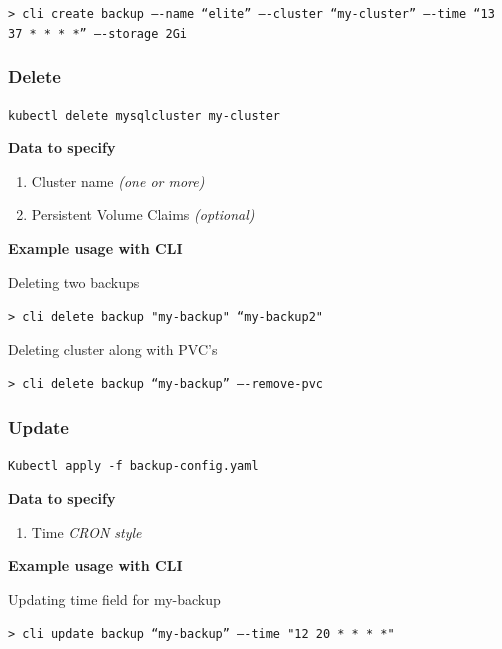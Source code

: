 \texttt{> cli create backup ----name “elite” ----cluster “my-cluster” \newline
 ----time “13 37  *  *  * *” ----storage 2Gi}

\subsubsection*{Delete}
\texttt{kubectl delete mysqlcluster my-cluster}

\noindent \textbf{Data to specify}
\begin{enumerate}
	\item Cluster name \textit{(one or more)}
	\item Persistent Volume Claims \textit{(optional)}
\end{enumerate}

\noindent \textbf{Example usage with CLI}

\noindent Deleting two backups

\texttt{> cli delete backup "my-backup" “my-backup2"}

\noindent Deleting cluster along with PVC’s

\texttt{> cli delete backup “my-backup” ----remove-pvc}

\subsubsection*{Update}
\texttt{Kubectl apply -f backup-config.yaml}

\noindent \textbf{Data to specify}
\begin{enumerate}
	\item Time \textit{CRON style}
\end{enumerate}

\noindent \textbf{Example usage with CLI}

\noindent Updating time field for my-backup

\texttt{> cli update backup “my-backup” ----time "12 20 * * * *"}